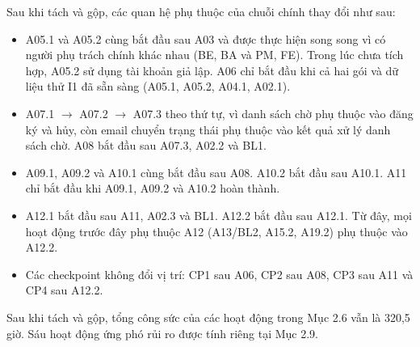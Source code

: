 Sau khi tách và gộp, các quan hệ phụ thuộc của chuỗi chính thay đổi như sau:

\begin{itemize}
    \item A05.1 và A05.2 cùng bắt đầu sau A03 và được thực hiện song song vì có người phụ trách chính khác nhau (BE, BA và PM, FE). Trong lúc chưa tích hợp, A05.2 sử dụng tài khoản giả lập. A06 chỉ bắt đầu khi cả hai gói và dữ liệu thử I1 đã sẵn sàng (A05.1, A05.2, A04.1, A02.1).
    \item A07.1 $\rightarrow$ A07.2 $\rightarrow$ A07.3 theo thứ tự, vì danh sách chờ phụ thuộc vào đăng ký và hủy, còn email chuyển trạng thái phụ thuộc vào kết quả xử lý danh sách chờ. A08 bắt đầu sau A07.3, A02.2 và BL1.
    \item A09.1, A09.2 và A10.1 cùng bắt đầu sau A08. A10.2 bắt đầu sau A10.1. A11 chỉ bắt đầu khi A09.1, A09.2 và A10.2 hoàn thành.
    \item A12.1 bắt đầu sau A11, A02.3 và BL1. A12.2 bắt đầu sau A12.1. Từ đây, mọi hoạt động trước đây phụ thuộc A12 (A13/BL2, A15.2, A19.2) phụ thuộc vào A12.2.
    \item Các checkpoint không đổi vị trí: CP1 sau A06, CP2 sau A08, CP3 sau A11 và CP4 sau A12.2.
\end{itemize}

Sau khi tách và gộp, tổng công sức của các hoạt động trong Mục 2.6 vẫn là 320,5 giờ. Sáu hoạt động ứng phó rủi ro được tính riêng tại Mục 2.9.
